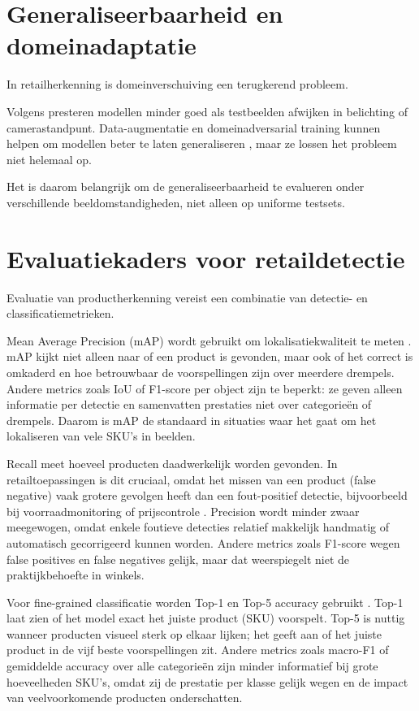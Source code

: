 \section{Generaliseerbaarheid en domeinadaptatie}

In retailherkenning is domeinverschuiving een terugkerend probleem.

Volgens \textcite{FRANCO2017163} presteren modellen minder goed als testbeelden afwijken in belichting of camerastandpunt. Data-augmentatie en domeinadversarial training kunnen helpen om modellen beter te laten generaliseren \autocite{wei2020retail}, maar ze lossen het probleem niet helemaal op.

Het is daarom belangrijk om de generaliseerbaarheid te evalueren onder verschillende beeldomstandigheden, niet alleen op uniforme testsets.

\section{Evaluatiekaders voor retaildetectie}

Evaluatie van productherkenning vereist een combinatie van detectie- en classificatiemetrieken.

Mean Average Precision (mAP) wordt gebruikt om lokalisatiekwaliteit te meten \autocite{MELEK2024108452}. mAP kijkt niet alleen naar of een product is gevonden, maar ook of het correct is omkaderd en hoe betrouwbaar de voorspellingen zijn over meerdere drempels. Andere metrics zoals IoU of F1-score per object zijn te beperkt: ze geven alleen informatie per detectie en samenvatten prestaties niet over categorieën of drempels. Daarom is mAP de standaard in situaties waar het gaat om het lokaliseren van vele SKU’s in beelden.

Recall meet hoeveel producten daadwerkelijk worden gevonden. In retailtoepassingen is dit cruciaal, omdat het missen van een product (false negative) vaak grotere gevolgen heeft dan een fout-positief detectie, bijvoorbeeld bij voorraadmonitoring of prijscontrole \autocite{FRANCO2017163}. Precision wordt minder zwaar meegewogen, omdat enkele foutieve detecties relatief makkelijk handmatig of automatisch gecorrigeerd kunnen worden. Andere metrics zoals F1-score wegen false positives en false negatives gelijk, maar dat weerspiegelt niet de praktijkbehoefte in winkels.

Voor fine-grained classificatie worden Top-1 en Top-5 accuracy gebruikt \autocite{PETTERSSON202410549}. Top-1 laat zien of het model exact het juiste product (SKU) voorspelt. Top-5 is nuttig wanneer producten visueel sterk op elkaar lijken; het geeft aan of het juiste product in de vijf beste voorspellingen zit. Andere metrics zoals macro-F1 of gemiddelde accuracy over alle categorieën zijn minder informatief bij grote hoeveelheden SKU’s, omdat zij de prestatie per klasse gelijk wegen en de impact van veelvoorkomende producten onderschatten.

